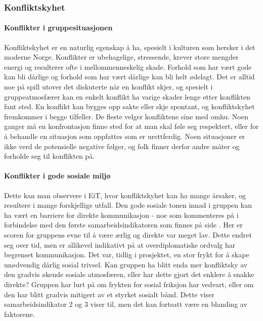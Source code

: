 \subsubsection{Konfliktskyhet}

\paragraph{Konflikter i gruppesituasjonen} Konfliktskyhet er en naturlig egenskap å ha, spesielt i kulturen som hersker i det moderne Norge.
Konflikter er ubehagelige, stressende, krever store mengder energi og resulterer ofte i mellommenneskelig skade.
Forhold som har vært gode kan bli dårlige og forhold som har vært dårlige kan bli helt ødelagt.
Det er alltid noe på spill utover det diskuterte når en konflikt skjer, og spesielt i gruppeatmosfærer kan en enkelt konflikt ha varige skader lenge etter konflikten fant sted. 
En konflikt kan bygges opp sakte eller skje spontant, og konfliktskyhet fremkommer i begge tilfeller. 
De fleste velger konfliktene sine med omhu. Noen ganger må en konfrontasjon finne sted for at man skal føle seg respektert, eller for å behandle en situasjon som oppfattes som er urettferdig. 
Noen situasjoner er ikke verd de potensielle negative følger, og folk finner derfor andre måter og forholde seg til konflikten på. 

\paragraph{Konflikter i gode sosiale miljø}
Dette kan man observere i EiT, hvor konfliktskyhet kan ha mange årsaker, og resultere i mange forskjellige utfall.
Den gode sosiale tonen innad i gruppen kan ha vært en barriere for direkte kommunikasjon - noe som kommenteres på i forbindelse med den første samarbeidsindikatoren som finnes på side \pageref{samarbeidsindikator1}. 
Her er scoren for gruppens evne til å være ærlig og direkte var meget lav.
Dette endret seg over tid, men er allikevel indikativt på at overdiplomatiske ordvalg har begrenset kommunikasjon.
Det var, tidlig i prosjektet, en stor frykt for å skape unødvendig dårlig sosial trivsel. 
Kan gruppen ha blitt enda mer konfliktsky av den gradvis økende sosiale atmosfæren, eller har dette gjort det enklere å snakke direkte?
Gruppen har lurt på om frykten for sosial friksjon har vedvart, eller om den har blitt gradvis mitigert av et styrket sosialt bånd. Dette viser samarbeidsindikator 2 og 3 viser til, men det kan fortsatt være en blanding av faktorene. 

